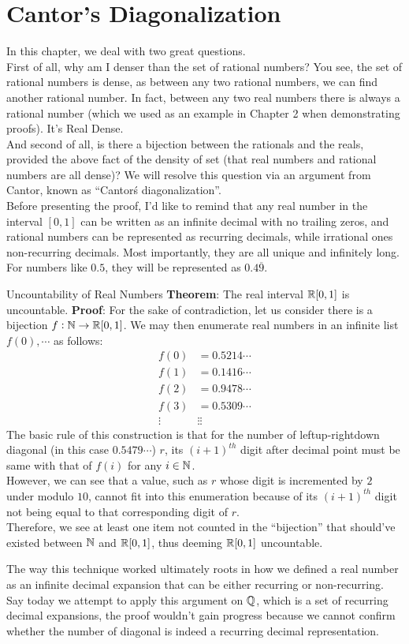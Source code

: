 \section{Cantor's Diagonalization}
In this chapter, we deal with two great questions. \\
First of all, why am I denser than the set of rational numbers? You see, the set of rational numbers is dense, as between any two rational numbers, we can find another rational number. In fact, between any two real numbers there is always a rational number (which we used as an example in Chapter 2 when demonstrating proofs). It's Real Dense. \\
And second of all, is there a bijection between the rationals and the reals, provided the above fact of the density of set (that real numbers and rational numbers are all dense)? We will resolve this question via an argument from Cantor, known as ``Cantor\'s diagonalization''. \\
Before presenting the proof, I'd like to remind that any real number in the interval $[0, 1]$ can be written as an infinite decimal with no trailing zeros, and rational numbers can be represented as recurring decimals, while irrational ones non-recurring decimals. Most importantly, they are all unique and infinitely long. For numbers like $0.5$, they will be represented as $0.4\overline{9}$.
\begin{ln-theorem}{Uncountability of Real Numbers}{}
    \textbf{Theorem}: The real interval $\mathbb{R}[0, 1]$ is uncountable.
    \tcblower
    \textbf{Proof}: For the sake of contradiction, let us consider there is a bijection $f: \mathbb{N} \rightarrow \mathbb{R}[0, 1]$. We may then enumerate real numbers in an infinite list $f(0), \cdots$ as follows:
    \begin{align*}
        f(0) &= 0.5214\cdots \\
        f(1) &= 0.1416\cdots \\
        f(2) &= 0.9478\cdots \\
        f(3) &= 0.5309\cdots \\
        \vdots &\vdots \vdots
    \end{align*}
    The basic rule of this construction is that for the number of leftup-rightdown diagonal (in this case $0.5479\cdots$) $r$, its ${(i + 1)}^{th}$ digit after decimal point must be same with that of $f(i)$ for any $i \in \mathbb{N}$. \\
    However, we can see that a value, such as $r$ whose digit is incremented by $2$ under modulo $10$, cannot fit into this enumeration because of its ${(i + 1)}^{th}$ digit not being equal to that corresponding digit of $r$. \\
    Therefore, we see at least one item not counted in the ``bijection'' that should've existed between $\mathbb{N}$ and $\mathbb{R}[0, 1]$, thus deeming $\mathbb{R}[0, 1]$ uncountable.
\end{ln-theorem}
The way this technique worked ultimately roots in how we defined a real number as an infinite decimal expansion that can be either recurring or non-recurring. Say today we attempt to apply this argument on $\mathbb{Q}$, which is a set of recurring decimal expansions, the proof wouldn't gain progress because we cannot confirm whether the number of diagonal is indeed a recurring decimal representation.

